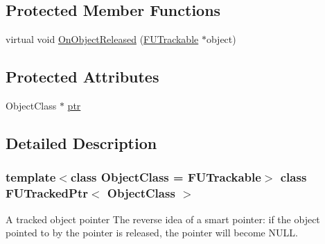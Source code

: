\subsection*{Protected Member Functions}
\begin{DoxyCompactItemize}
\item 
virtual void \hyperlink{classFUTrackedPtr_afb32d45ac4620963033cd64ee95a2ee1}{OnObjectReleased} (\hyperlink{classFUTrackable}{FUTrackable} $\ast$object)
\end{DoxyCompactItemize}
\subsection*{Protected Attributes}
\begin{DoxyCompactItemize}
\item 
ObjectClass $\ast$ \hyperlink{classFUTrackedPtr_aa7964388a4365d5823467848dd5de579}{ptr}
\end{DoxyCompactItemize}


\subsection{Detailed Description}
\subsubsection*{template$<$class ObjectClass = FUTrackable$>$ class FUTrackedPtr$<$ ObjectClass $>$}

A tracked object pointer The reverse idea of a smart pointer: if the object pointed to by the pointer is released, the pointer will become NULL. 

